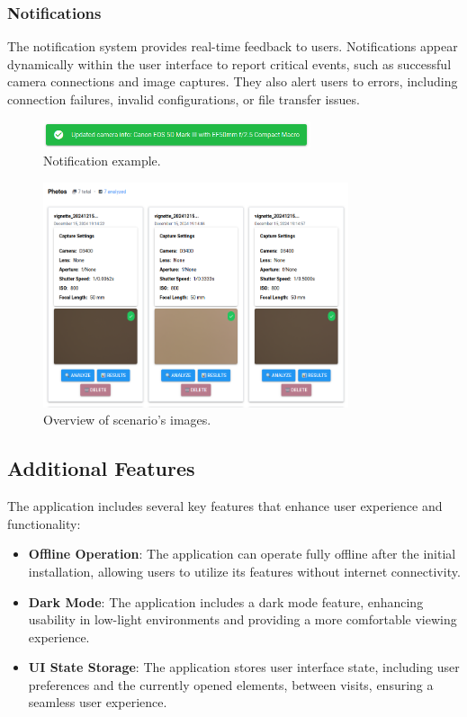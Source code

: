 \subsubsection{Notifications}
The notification system provides real-time feedback to users. Notifications appear dynamically within the user interface to report critical events, such as successful camera connections and image captures. They also alert users to errors, including connection failures, invalid configurations, or file transfer issues.

\begin{figure}[h]
\centering
\includegraphics[width=0.7\textwidth]{Images/notification.png}
\caption{Notification example.}
\label{fig:ui_notification}
\end{figure}

\begin{figure}[hbt]
\centering
\includegraphics[width=0.8\textwidth]{Images/scenario_photos.png}
\caption{Overview of scenario's images.}
\label{fig:ui_scenario_images}
\end{figure}

\subsection{Additional Features}
The application includes several key features that enhance user experience and functionality:
\begin{itemize}
    \item \textbf{Offline Operation}: The application can operate fully offline after the initial installation, allowing users to utilize its features without internet connectivity.
    \item \textbf{Dark Mode}: The application includes a dark mode feature, enhancing usability in low-light environments and providing a more comfortable viewing experience.
    \item \textbf{UI State Storage}: The application stores user interface state, including user preferences and the currently opened elements, between visits, ensuring a seamless user experience.
\end{itemize}

